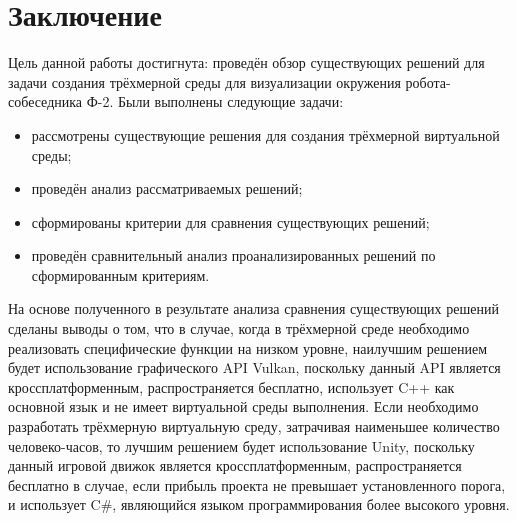 \chapter*{Заключение}
Цель данной работы достигнута: проведён обзор существующих решений для задачи создания трёхмерной среды для визуализации окружения робота-собеседника Ф-2. Были выполнены следующие задачи:
\begin{itemize}
\item рассмотрены существующие решения для создания трёхмерной виртуальной среды;
\item проведён анализ рассматриваемых решений;
\item сформированы критерии для сравнения существующих решений;
\item проведён сравнительный анализ проанализированных решений по сформированным критериям.
\end{itemize}

На основе полученного в результате анализа сравнения существующих решений сделаны выводы о том, что в случае, когда в трёхмерной среде необходимо реализовать специфические функции на низком уровне, наилучшим решением будет использование графического API Vulkan, поскольку данный API является кроссплатформенным, распространяется бесплатно, использует C++ как основной язык и не имеет виртуальной среды выполнения. Если необходимо разработать трёхмерную виртуальную среду, затрачивая наименьшее количество человеко-часов, то лучшим решением будет использование Unity, поскольку данный игровой движок является кроссплатформенным, распространяется бесплатно в случае, если прибыль проекта не превышает установленного порога, и использует C\#, являющийся языком программирования более высокого уровня.
